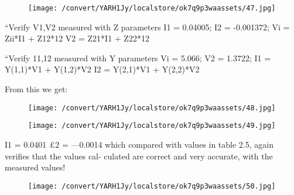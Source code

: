 \documentclass[12pt]{report}
\begin{document}
\vspace{10pt}

\begin{figure}[h]

\texttt{[image: /convert/YARH1Jy/localstore/ok7q9p3waassets/47.jpg]}

\centering

\end{figure}

\par

\vspace{10pt}

    “Verify V1,V2 measured with Z parameters  I1 = 0.04005;   I2 = -0.001372;   Vi = Zii*I1 + Z12*12   V2 = Z21*I1 + Z22*12 

\vspace{10pt}

    “Verify 11,12 measured with Y parameters  Vi = 5.066;    V2 = 1.3722;  I1 = Y(1,1)*V1 + Y(1,2)*V2  I2 = Y(2,1)*V1 + Y(2,2)*V2 

\vspace{10pt}

    From this we get: 

\vspace{10pt}

\begin{figure}[h]

\texttt{[image: /convert/YARH1Jy/localstore/ok7q9p3waassets/48.jpg]}

\centering

\end{figure}

\begin{figure}[h]

\texttt{[image: /convert/YARH1Jy/localstore/ok7q9p3waassets/49.jpg]}

\centering

\end{figure}

    I1 = 0.0401 £2 = —0.0014    which compared with values in table 2.5, again verifies that the values cal-  culated are correct and very accurate, with the measured values! 

\vspace{10pt}

\begin{figure}[h]

\texttt{[image: /convert/YARH1Jy/localstore/ok7q9p3waassets/50.jpg]}

\centering

\end{figure}
\end{document}

